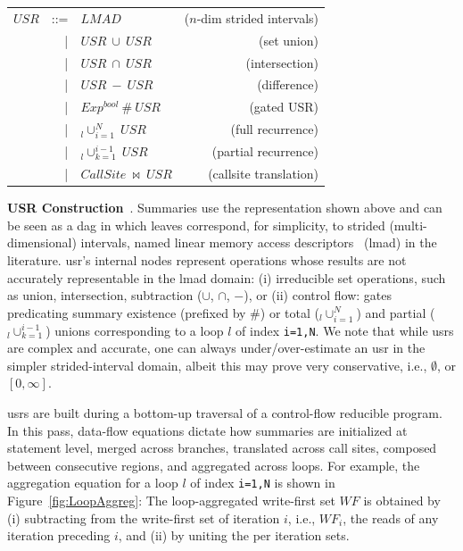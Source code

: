\documentclass{sig-alternate}
\begin{document}
\vspace{1ex}
\hspace{-4ex}
\begin{tabular}{lclr}
$USR$ & ::= &  $LMAD$                 & ($n$-dim strided intervals)\\
      & {\tt~~}| & $USR \ \cup \ USR$ & (set union)\\
      & {\tt~~}| & $USR \ \cap \ USR$ & (intersection)\\
      & {\tt~~}| & $USR \ - \ USR$ & (difference)\\
      & {\tt~~}| & $Exp^{bool} \ \# \ USR$ & (gated USR)\\
      & {\tt~~}| & $_l\cup_{i=1}^{N} \ USR$ & (full recurrence)\\
      & {\tt~~}| & $_l\cup_{k=1}^{i-1} \ USR$ & (partial recurrence)\\
      & {\tt~~}| & $CallSite \ \bowtie \ USR$ & (callsite translation)
\end{tabular}%
\vspace{1ex}

{\bf USR Construction}~\cite{HybAn}.
%
Summaries use the representation shown above %
and can be seen as a {\sc dag} in which leaves correspond,
for simplicity, to strided (multi-dimensional) intervals, 
named linear memory access descriptors~\cite{LMAD} ({\sc lmad}) in the literature.
{\sc usr}'s internal nodes represent operations whose results are not
accurately representable in the {\sc lmad} domain: (i) irreducible set
operations, such as union, intersection, subtraction ($\cup$, $\cap$, $-$), 
or (ii) control flow: gates predicating
summary existence (prefixed by $\#$) or total ($_l\cup_{i=1}^N$) and partial 
($_l\cup_{k=1}^{i-1}$) unions corresponding to a loop $l$ of
index {\tt i=1,N}. 
%
We note that while {\sc usr}s are complex and accurate,
one can always under/over-estimate an {\sc usr} in the 
simpler strided-interval domain, albeit this may 
prove very conservative, i.e., $\emptyset$, or $[0,\infty]$. 


{\sc usr}s are built during a bottom-up traversal of a control-flow 
reducible program.
%
In this pass, data-flow equations dictate how summaries 
are initialized at statement level, merged across branches, 
translated across call sites, composed between consecutive 
regions, and aggregated across loops. 
%
For example, the aggregation equation for a loop $l$ of index 
{\tt i=1,N} is shown in Figure~\ref{fig:LoopAggreg}:
The loop-aggregated write-first set $WF$ is obtained 
by (i) subtracting from the write-first set of iteration 
$i$, i.e., $WF_i$, the reads of any iteration preceding $i$,
and (ii) by uniting the per iteration sets. %
\end{document}
